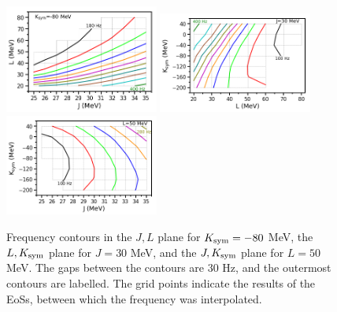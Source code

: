 \documentclass[fleqn,usenatbib]{mnras}
\begin{document}
\begin{figure}
\centering
\includegraphics[width=0.45\textwidth,angle=0]{J_L_contour_K-80.png}
\includegraphics[width=0.45\textwidth,angle=0]{L_K_contour_J30.png}
\includegraphics[width=0.45\textwidth,angle=0]{J_K_contour_L50.png}
\caption{Frequency contours in the $J,L$ plane for $K_{\rm sym}=-80$ MeV, the $L,K_{\rm sym}$ plane for $J=30$ MeV, and the $J,K_{\rm sym}$ plane for $L=50$ MeV. The gaps between the contours are $30$ Hz, and the outermost contours are labelled. The grid points indicate the results of the EoSs, between which the frequency was interpolated.}
\label{fig:freq_contours_plane}
\end{figure}

\end{document}
